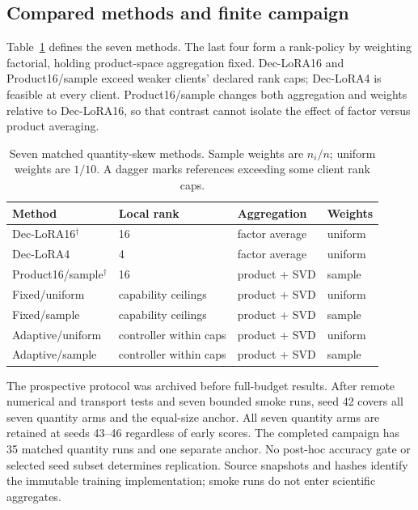 \documentclass[11pt]{article}
\begin{document}
\subsection{Compared methods and finite campaign}
Table~\ref{tab:arms} defines the seven methods. The last four form a rank-policy by weighting factorial, holding product-space aggregation fixed. Dec-LoRA16 and Product16/sample exceed weaker clients' declared rank caps; Dec-LoRA4 is feasible at every client. Product16/sample changes both aggregation and weights relative to Dec-LoRA16, so that contrast cannot isolate the effect of factor versus product averaging.
\begin{table}[t]
\centering\small
\caption{Seven matched quantity-skew methods. Sample weights are $n_i/n$; uniform weights are $1/10$. A dagger marks references exceeding some client rank caps.}
\label{tab:arms}
\begin{tabular}{llll}
\toprule
Method & Local rank & Aggregation & Weights\\
\midrule
Dec-LoRA16$^\dagger$ & 16 & factor average & uniform\\
Dec-LoRA4 & 4 & factor average & uniform\\
Product16/sample$^\dagger$ & 16 & product + SVD & sample\\
Fixed/uniform & capability ceilings & product + SVD & uniform\\
Fixed/sample & capability ceilings & product + SVD & sample\\
Adaptive/uniform & controller within caps & product + SVD & uniform\\
Adaptive/sample & controller within caps & product + SVD & sample\\
\bottomrule
\end{tabular}
\end{table}

The prospective protocol was archived before full-budget results. After remote numerical and transport tests and seven bounded smoke runs, seed 42 covers all seven quantity arms and the equal-size anchor. All seven quantity arms are retained at seeds 43--46 regardless of early scores. The completed campaign has 35 matched quantity runs and one separate anchor. No post-hoc accuracy gate or selected seed subset determines replication. Source snapshots and hashes identify the immutable training implementation; smoke runs do not enter scientific aggregates.
\end{document}
